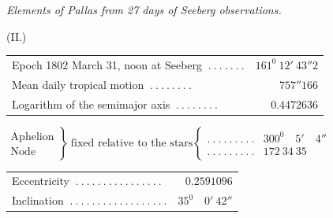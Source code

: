 \begin{center}
\textit{Elements of Pallas from 27 days of Seeberg observations.}\par\medskip
(II.)\par\medskip
{\small\setlength{\tabcolsep}{2pt}
\begin{tabular}{l r}
Epoch 1802 March 31, noon at Seeberg $\ .\ .\ .\ .\ .\ .\ .$&$161^0\ 12'\ 43''2$\\
Mean daily tropical motion $\ .\ .\ .\ .\ .\ .\ .\ .$&$757''166$\\
Logarithm of the semimajor axis $\ .\ .\ .\ .\ .\ .\ .\ .$&$0.4472636$
\end{tabular}
\par\smallskip
$\left.\begin{array}{l}\text{Aphelion}\\\text{Node}\end{array}\right\}\ \text{fixed relative to the stars}\left\{\begin{array}{lr}
.\ .\ .\ .\ .\ .\ .\ .\ .&300^0\quad5'\quad4''\\
.\ .\ .\ .\ .\ .\ .\ .\ .&172\ 34\ 35
\end{array}\right.$
\par\smallskip
\begin{tabular}{l r}
Eccentricity $\ .\ .\ .\ .\ .\ .\ .\ .\ .\ .\ .\ .\ .\ .\ .\ .$&$0.2591096$\\
Inclination $\ .\ .\ .\ .\ .\ .\ .\ .\ .\ .\ .\ .\ .\ .\ .\ .\ .\ .$&$35^0\quad0'\ 42''$
\end{tabular}}
\end{center}

